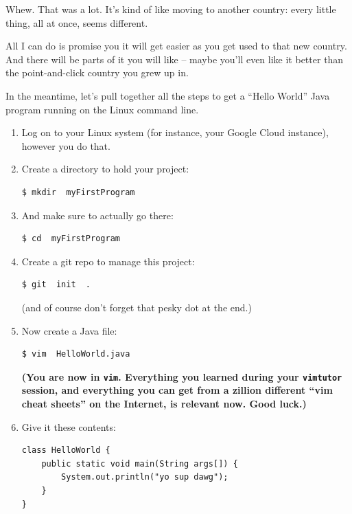 Whew. That was a lot. It's kind of like moving to another country: every
little thing, all at once, seems different.

All I can do is promise you it will get easier as you get used to that new
country. And there will be parts of it you will like -- maybe you'll even like
it better than the point-and-click country you grew up in.

\pagebreak
{}
In the meantime, let's pull together all the steps to get a ``Hello World''
Java program running on the Linux command line.

\begin{enumerate}
\itemsep.1em
\item Log on to your Linux system (for instance, your Google Cloud instance),
however you do that.
\item Create a directory to hold your project:
\begin{Verbatim}[fontsize=\small]
$ mkdir  myFirstProgram
\end{Verbatim}

\item And make sure to actually go there:
\begin{Verbatim}[fontsize=\small]
$ cd  myFirstProgram
\end{Verbatim}

\item Create a git repo to manage this project:
\begin{Verbatim}[fontsize=\small]
$ git  init  .
\end{Verbatim}

(and of course don't forget that pesky dot at the end.)

\item Now create a Java file:
\begin{Verbatim}[fontsize=\small]
$ vim  HelloWorld.java
\end{Verbatim}

\textbf{(You are now in \texttt{vim}. Everything you learned during your
\texttt{vimtutor} session, and everything you can get from a zillion different
``vim cheat sheets'' on the Internet, is relevant now. Good luck.)}

\item Give it these contents:
\begin{Verbatim}[fontsize=\small,frame=single]
class HelloWorld {
    public static void main(String args[]) {
        System.out.println("yo sup dawg");
    }
}
\end{Verbatim}


\end{enumerate}
